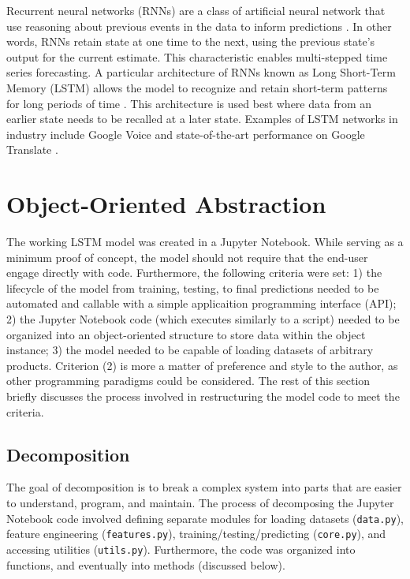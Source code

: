 \documentclass[11pt, oneside, authoryear]{report}
\begin{document}
Recurrent neural networks (RNNs) are a class of artificial neural network that use reasoning about previous events in the data to inform predictions \citep{olah}. In other words, RNNs retain state at one time to the next, using the previous state's output for the current estimate. This characteristic enables multi-stepped time series forecasting. A particular architecture of RNNs known as Long Short-Term Memory (LSTM) allows the model to recognize and retain short-term patterns for long periods of time \citep{hochreiter}. This architecture is used best where data from an earlier state needs to be recalled at a later state. Examples of LSTM networks in industry include Google Voice \citep{beaufays} and state-of-the-art performance on Google Translate \citep{le}.

\section{Object-Oriented Abstraction}
The working LSTM model was created in a Jupyter Notebook. While serving as a minimum proof of concept, the model should not require that the end-user engage directly with code. Furthermore, the following criteria were set: 1) the lifecycle of the model from training, testing, to final predictions needed to be automated and callable with a simple applicaition programming interface (API); 2) the Jupyter Notebook code (which executes similarly to a script) needed to be organized into an object-oriented structure to store data within the object instance; 3) the model needed to be capable of loading datasets of arbitrary products. Criterion (2) is more a matter of preference and style to the author, as other programming paradigms could be considered. The rest of this section briefly discusses the process involved in restructuring the model code to meet the criteria.

\subsection{Decomposition}
The goal of decomposition is to break a complex system into parts that are easier to understand, program, and maintain. The process of decomposing the Jupyter Notebook code involved defining separate modules for loading datasets (\texttt{data.py}), feature engineering (\texttt{features.py}), training/testing/predicting (\texttt{core.py}), and accessing utilities (\texttt{utils.py}). Furthermore, the code was organized into functions, and eventually into methods (discussed below).
\end{document}
